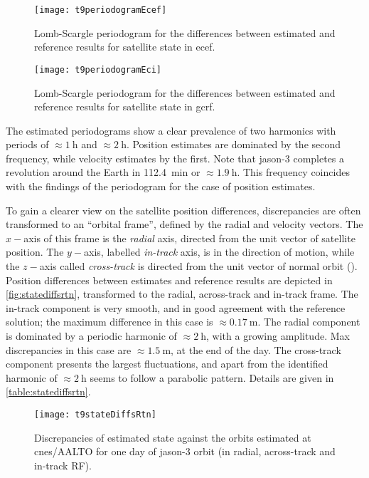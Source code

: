 \begin{figure}[ht]
    \centering
    \texttt{[image: t9periodogramEcef]}
    \caption{Lomb-Scargle periodogram for the differences between estimated and reference results for satellite state in \gls{ecef}.}
    \label{fig:lsperiodecef}
\end{figure}

\begin{figure}[ht]
    \centering
    \texttt{[image: t9periodogramEci]}
    \caption{Lomb-Scargle periodogram for the differences between estimated and reference results for satellite state in \gls{gcrf}.}
    \label{fig:lsperiodeci}
\end{figure}

The estimated periodograms show a clear prevalence of two harmonics with periods of 
$\approx \SI{1}{\hour}$ and $\approx \SI{2}{\hour}$. Position estimates are dominated by 
the second frequency, while velocity estimates by the first. Note that \gls{jason}-3 
completes a revolution around the Earth in \SI{112.4}{\minute} or $\approx \SI{1.9}{\hour}$. 
This frequency coincides with the findings of the periodogram for the case of position 
estimates.

To gain a clearer view on the satellite position differences, discrepancies are often 
transformed to an ``orbital frame'', defined by the radial and velocity vectors. 
The $x-$axis of this frame is the \emph{radial} axis, directed from the unit vector of 
satellite position. The $y-$axis, labelled \emph{in-track} axis, is in the direction 
of motion, while the $z-$axis called \emph{cross-track} is directed from the unit 
vector of normal orbit (\cite{Eunhyouek2019}). Position differences between estimates and 
reference results are depicted in \autoref{fig:statediffsrtn}, transformed to the radial, 
across-track and in-track frame. The in-track component is very smooth, and in good 
agreement with the reference solution; the maximum difference in this case is 
$\approx \SI{0.17}{\meter}$. The radial component is dominated by a periodic harmonic of 
$\approx \SI{2}{\hour}$, with a growing amplitude. Max discrepancies in this case are 
$\approx \SI{1.5}{\meter}$, at the end of the day. The cross-track component presents the 
largest fluctuations, and apart from the identified harmonic of $\approx \SI{2}{\hour}$ 
seems to follow a parabolic pattern. Details are given in \autoref{table:statediffsrtn}.
\begin{figure}[ht]
    \centering
    \texttt{[image: t9stateDiffsRtn]}
    \caption{Discrepancies of estimated state against the orbits estimated at \gls{cnes}/AALTO for one day of \gls{jason}-3 orbit (in radial, across-track and in-track RF).}
    \label{fig:statediffsrtn}
\end{figure}

